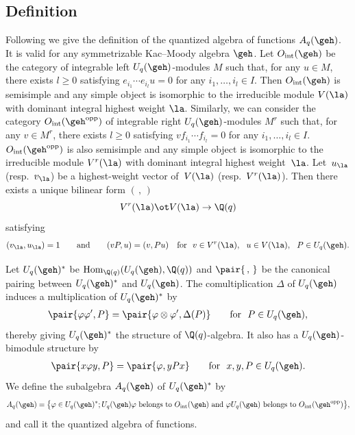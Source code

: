 \subsection{Def\/inition}

Following \cite{Kas93}
we give the def\/inition of the quantized algebra of functions $A_q(\geh)$.
It is valid for any symmetrizable Kac--Moody algebra $\geh$. Let $O_\mathrm{int}(\geh)$ be the
category of integrable left $U_q(\geh)$-modules $M$ such that, for any $u\in M$, there exists $l\ge0$
satisfying $e_{i_1}\cdots e_{i_l}u=0$ for any $i_1,\ldots,i_l\in I$. Then $O_\mathrm{int}(\geh)$
is semisimple and any simple object is isomorphic to the irreducible module $V(\la)$ with
dominant integral highest weight $\la$.
Similarly, we can consider the category $O_\mathrm{int}(\geh^\mathrm{opp})$ of integrable
right $U_q(\geh)$-modules $M^r$ such that, for any $v\in M^r$, there exists $l\ge0$ satisfying
$vf_{i_1}\cdots f_{i_l}=0$ for any $i_1,\ldots,i_l\in I$. $O_\mathrm{int}(\geh^\mathrm{opp})$
is also semisimple and any simple object is isomorphic to the irreducible module $V^r(\la)$ with
dominant integral highest weight~$\la$. Let~$u_\la$ (resp.~$v_\la$) be a highest-weight vector
of~$V(\la)$ (resp.~$V^r(\la)$). Then there exists a unique bilinear form $(\,,\,)$
\[
V^r(\la)\ot V(\la)\rightarrow \Q(q)
\]
satisfying
\begin{gather*}
(v_\la,u_\la) =1\qquad\text{and}\qquad
(vP,u) =(v,Pu)\quad\text{for} \ \ v\in V^r(\la), \ \ u\in V(\la), \ \ P\in U_q(\geh).
\end{gather*}

Let $U_q(\geh)^*$ be $\mathrm{Hom}_{\Q(q)}(U_q(\geh),\Q(q))$ and $\pair{\,,\,}$ be the canonical
pairing between $U_q(\geh)^*$ and $U_q(\geh)$. The comultiplication $\Delta$ of $U_q(\geh)$ induces
a multiplication of $U_q(\geh)^*$ by
\begin{gather}\label{eq:mult}
\pair{\varphi\varphi',P}=\pair{\varphi\otimes\varphi',\Delta(P)}\qquad\text{for} \ \ P\in U_q(\geh),
\end{gather}
thereby giving $U_q(\geh)^*$ the structure of $\Q(q)$-algebra. It also has a $U_q(\geh)$-bimodule structure
by
\begin{gather}\label{eq:bimodule}
\pair{x\varphi y,P}=\pair{\varphi,yPx}\qquad\text{for} \ \ x,y,P\in U_q(\geh).
\end{gather}
We def\/ine the subalgebra $A_q(\geh)$ of $U_q(\geh)^*$ by
\[
A_q(\geh)=\big\{\varphi\in U_q(\geh)^*;U_q(\geh)\varphi\text{ belongs to }O_\mathrm{int}(\geh)\text{ and }
\varphi U_q(\geh)\text{ belongs to }O_\mathrm{int}(\geh^\mathrm{opp})\big\},
\]
and call it the quantized algebra of functions.

